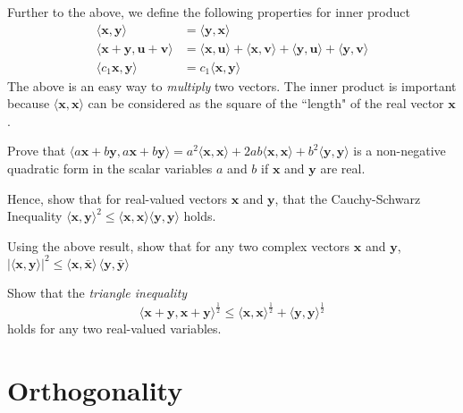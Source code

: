 Further to the above, we define the following properties for inner product
%
\begin{subequations}
	\begin{align}
	\langle \bm{x}, \bm{y} \rangle &= 	\langle \bm{y}, \bm{x} \rangle \\
	\langle \bm{x} + \bm{y},  \bm{u} + \bm{v}\rangle &= \langle \bm{x}, \bm{u} \rangle  + \langle \bm{x}, \bm{v} \rangle + \langle \bm{y}, \bm{u} \rangle + \langle \bm{y}, \bm{v} \rangle \\
	\langle c_1 \bm{x}, \bm{y} \rangle &= c_1 \langle \bm{x}, \bm{y} \rangle
	\end{align}
\end{subequations}
%
The above is an easy way to \textit{multiply} two vectors. The inner product is important because $\langle \bm{x}, \bm{x} \rangle$ can be considered as the square of the ``length" of the real vector $\bm{x}$. 
%
\begin{homework}
	Prove that $\langle a\bm{x}+b \bm{y}, a\bm{x}+b \bm{y} \rangle = a^2 \langle \bm{x}, \bm{x} \rangle + 2 ab \langle \bm{x}, \bm{x} \rangle  + b^2 \langle \bm{y}, \bm{y} \rangle $ is a non-negative quadratic form in the scalar variables $a$ and $b$ if $\bm{x}$ and $\bm{y}$ are real.
\end{homework}
%
\begin{homework}
	Hence, show that for real-valued vectors $\bm{x}$ and $\bm{y}$, that the Cauchy-Schwarz Inequality $\langle \bm{x}, \bm{y} \rangle^2 \le  \langle \bm{x}, \bm{x} \rangle \langle \bm{y}, \bm{y} \rangle$ holds.
\end{homework}
%
\begin{homework}
	Using the above result, show that  for any two complex vectors $\bm{x}$  and $\bm{y}$, $|\langle \bm{x}, \bm{y}\rangle|^2 \le \langle \bm{x}, \bar{\bm{x}}\rangle \, \langle \bm{y}, \bar{\bm{y}}\rangle$
\end{homework}
%
\begin{homework}
	Show that the \textit{triangle inequality} 
	\[
		\langle \bm{x}+ \bm{y}, \bm{x}+ \bm{y} \rangle^{\frac{1}{2}} \le \langle \bm{x}, \bm{x} \rangle^{\frac{1}{2}}  + \langle  \bm{y},  \bm{y} \rangle^{\frac{1}{2}} 
	\]
	holds for any two real-valued variables.
\end{homework}

\section{Orthogonality}

